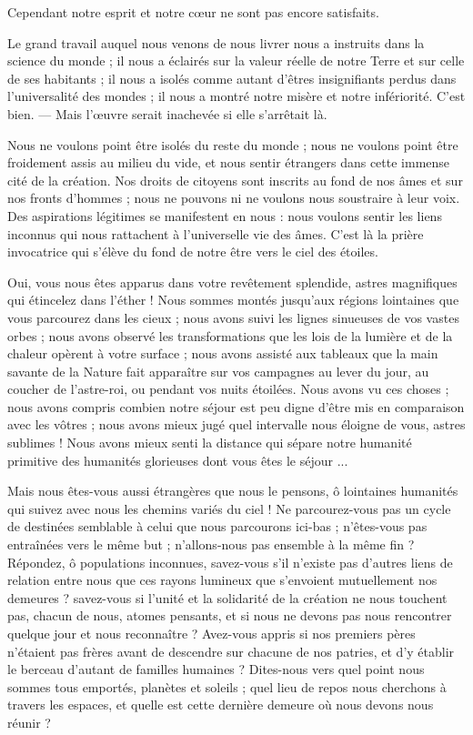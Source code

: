 \documentclass[a4paper, 11pt, oneside]{article}
\begin{document}
Cependant notre esprit et notre cœur ne sont pas encore satisfaits.

Le grand travail auquel nous venons de nous livrer nous a instruits dans la science du monde ; il nous a éclairés sur la valeur réelle de notre Terre et sur celle de ses habitants ; il nous a isolés comme autant d'êtres insignifiants perdus dans l'universalité des mondes ; il nous a montré notre misère et notre infériorité. C'est bien. --- Mais l'œuvre serait inachevée si elle s'arrêtait là.

Nous ne voulons point être isolés du reste du monde ; nous ne voulons point être froidement assis au milieu du vide, et nous sentir étrangers dans cette immense cité de la création. Nos droits de citoyens sont inscrits au fond de nos âmes et sur nos fronts d'hommes ; nous ne pouvons ni ne voulons nous soustraire à leur voix. Des aspirations légitimes se manifestent en nous : nous voulons sentir les liens inconnus qui nous rattachent à l'universelle vie des âmes. C'est là la prière invocatrice qui s'élève du fond de notre être vers le ciel des étoiles.

Oui, vous nous êtes apparus dans votre revêtement splendide, astres magnifiques qui étincelez dans l'éther ! Nous sommes montés jusqu'aux régions lointaines que vous parcourez dans les cieux ; nous avons suivi les lignes sinueuses de vos vastes orbes ; nous avons observé les transformations que les lois de la lumière et de la chaleur opèrent à votre surface ; nous avons assisté aux tableaux que la main savante de la Nature fait apparaître sur vos campagnes au lever du jour, au coucher de l'astre-roi, ou pendant vos nuits étoilées. Nous avons vu ces choses ; nous avons compris combien notre séjour est peu digne d'être mis en comparaison avec les vôtres ; nous avons mieux jugé quel intervalle nous éloigne de vous, astres sublimes ! Nous avons mieux senti la distance qui sépare notre humanité primitive des humanités glorieuses dont vous êtes le séjour ...

Mais nous êtes-vous aussi étrangères que nous le pensons, ô lointaines humanités qui suivez avec nous les chemins variés du ciel ! Ne parcourez-vous pas un cycle de destinées semblable à celui que nous parcourons ici-bas ; n'êtes-vous pas entraînées vers le même but ; n'allons-nous pas ensemble à la même fin ? Répondez, ô populations inconnues, savez-vous s'il n'existe pas d'autres liens de relation entre nous que ces rayons lumineux que s'envoient mutuellement nos demeures ? savez-vous si l'unité et la solidarité de la création ne nous touchent pas, chacun de nous, atomes pensants, et si nous ne devons pas nous rencontrer quelque jour et nous reconnaître ? Avez-vous appris si nos premiers pères n'étaient pas frères avant de descendre sur chacune de nos patries, et d'y établir le berceau d'autant de familles humaines ? Dites-nous vers quel point nous sommes tous emportés, planètes et soleils ; quel lieu de repos nous cherchons à travers les espaces, et quelle est cette dernière demeure où nous devons nous réunir ?
\end{document}
